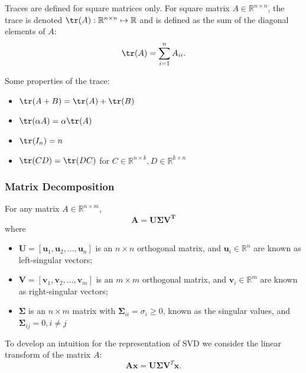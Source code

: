 \begin{definition}[Traces]
  Traces are defined for square matrices only. For square matrix $A\in
  \mathbb{R}^{n\times n}$, the trace is denoted $\tr(A):\mathbb{R}^{n\times
  n}\mapsto \mathbb{R}$ and is defined as the sum of the diagonal elements of
  $A$:
  \[\tr(A)=\sum_{i=1}^{n} A_{ii}.\] 
\end{definition}
\begin{remark}
  Some properties of the trace:
  \begin{itemize}
    \item $\tr(A+B)=\tr(A)+\tr(B)$ 
    \item $\tr(\alpha A)=\alpha\tr(A)$
    \item $\tr(I_{n})=n$ 
    \item $\tr(CD)=\tr(DC)$ for $C\in \mathbb{R}^{n\times k},D\in \mathbb{R}^{k\times n}$
  \end{itemize}
\end{remark}
\subsubsection{Matrix Decomposition}
\begin{definition}
  For any matrix $A\in \mathbb{R}^{n\times m}$,
  \[\mathbf{A}=\mathbf{U\Sigma V^{T}}\]
  where
  \begin{itemize}
    \item $\mathbf{U} = [\mathbf{u}_1, \mathbf{u}_2,\ldots,\mathbf{u}_n]$ is an $n \times n$ orthogonal matrix, and $\mathbf{u}_i \in \mathbb{R}^n$ are known as left-singular vectors;
    \item $\mathbf{V} = [\mathbf{v}_1, \mathbf{v}_2,\ldots,\mathbf{v}_m]$ is an $m \times m$ orthogonal matrix, and $\mathbf{v}_i \in \mathbb{R}^m$ are known as right-singular vectors;
    \item $\boldsymbol{\Sigma}$ is an $n \times m$ matrix with $\boldsymbol{\Sigma}_{ii} = \sigma_{i} \geq 0$, known as the singular values, and $\boldsymbol{\Sigma}_{ij} = 0, i \neq j$
  \end{itemize}
\end{definition}
To develop an intuition for the representation of SVD we consider the linear
transform of the matrix $A$:
 \[\mathbf{A} \mathbf{x} = \mathbf{U} \boldsymbol{\Sigma} \mathbf{V}^{T} \mathbf{x}.\] 

